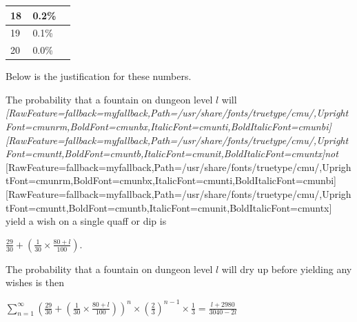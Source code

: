 \begin{longtable}{|>{\RaggedRight}p{0.32504\linewidth}|>{\RaggedRight}p{0.61782\linewidth}|}
\hspace*{0pt}\ignorespaces{}\hspace*{0pt}18&\hspace*{0pt}\ignorespaces{}\hspace*{0pt}0.2\%\\ \hline \hspace*{0pt}\ignorespaces{}\hspace*{0pt}19&\hspace*{0pt}\ignorespaces{}\hspace*{0pt}0.1\%\\ \hline \hspace*{0pt}\ignorespaces{}\hspace*{0pt}20&\hspace*{0pt}\ignorespaces{}\hspace*{0pt}0.0\%\\ \hline 
\end{longtable}

Below is the justification for these numbers.


The probability that a fountain on dungeon level {$
l$} will {\itshape \allowbreak{}\setmainfont{cmunti.ttf}[RawFeature={fallback=myfallback},Path=/usr/share/fonts/truetype/cmu/,UprightFont=cmunrm,BoldFont=cmunbx,ItalicFont=cmunti,BoldItalicFont=cmunbi]\setmonofont{cmunti.ttf}[RawFeature={fallback=myfallback},Path=/usr/share/fonts/truetype/cmu/,UprightFont=cmuntt,BoldFont=cmuntb,ItalicFont=cmunit,BoldItalicFont=cmuntx]\itshape not}{$\text{ }$}\allowbreak{}\setmainfont{cmunrm.ttf}[RawFeature={fallback=myfallback},Path=/usr/share/fonts/truetype/cmu/,UprightFont=cmunrm,BoldFont=cmunbx,ItalicFont=cmunti,BoldItalicFont=cmunbi]\setmonofont{cmunrm.ttf}[RawFeature={fallback=myfallback},Path=/usr/share/fonts/truetype/cmu/,UprightFont=cmuntt,BoldFont=cmuntb,ItalicFont=cmunit,BoldItalicFont=cmuntx] yield a wish on a single quaff or dip is




\begin{myquote}
\item{}{$
 \frac{29}{30}+\left(\frac{1}{30}\times\frac{80+l}{100}\right)$}.
\end{myquote}

The probability that a fountain on dungeon level {$
l$} will dry up before yielding any wishes is then




\begin{myquote}
\item{}{$
 \sum_{n=1}^{\infty} \left(\frac{29}{30}+\left(\frac{1}{30}\times\frac{80+l}{100}\right)\right)^{n}\times\left(\frac{2}{3}\right)^{n-1}\times\frac{1}{3} = \frac{l+2980}{3040-2l}$}
\end{myquote}

